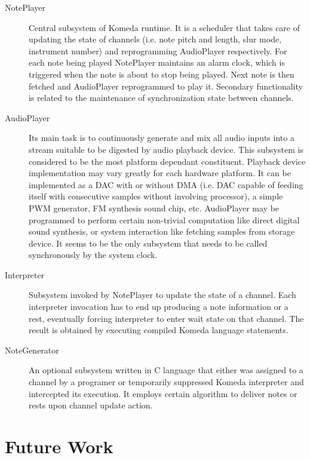 \documentclass{article}
\begin{document}
\begin{description}
  \item[NotePlayer] Central subsystem of Komeda runtime. It is a scheduler that
    takes care of updating the state of channels (i.e. note pitch and length,
    slur mode, instrument number) and reprogramming AudioPlayer respectively.
    For each note being played NotePlayer maintains an alarm clock, which is
    triggered when the note is about to stop being played. Next note is then
    fetched and AudioPlayer reprogrammed to play it. Secondary functionality is
    related to the maintenance of synchronization state between channels.

  \item[AudioPlayer] Its main task is to continuously generate and mix all
    audio inputs into a stream suitable to be digested by audio playback
    device. This subsystem is considered to be the most platform dependant
    constituent. Playback device implementation may vary greatly for each
    hardware platform. It can be implemented as a DAC with or without DMA (i.e.
    DAC capable of feeding itself with consecutive samples without involving
    processor), a simple PWM generator, FM synthesis sound chip, etc.
    AudioPlayer may be programmed to perform certain non-trivial computation
    like direct digital sound synthesis, or system interaction like fetching
    samples from storage device.  It seems to be the only subsystem that needs
    to be called synchronously by the system clock.

  \item[Interpreter] Subsystem invoked by NotePlayer to update the state of a
    channel. Each interpreter invocation has to end up producing a note
    information or a rest, eventually forcing interpreter to enter wait state
    on that channel. The result is obtained by executing compiled Komeda
    language statements.

  \item[NoteGenerator] An optional subsystem written in C language that either
    was assigned to a channel by a programer or temporarily suppressed Komeda
    interpreter and intercepted its execution. It employs certain algorithm to
    deliver notes or rests upon channel update action.
\end{description}

\section{Future Work}
\end{document}
